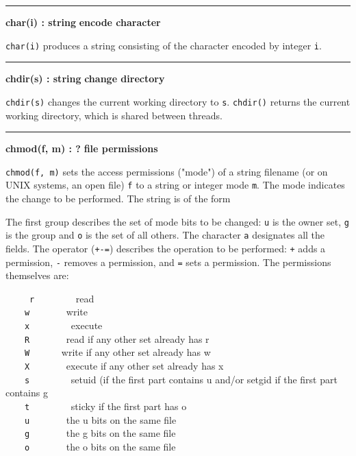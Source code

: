 \bigskip
\hrule\vspace{0.1cm}
\noindent
{\bf char(i) : string } \hfill {\bf encode character}

\noindent
{}\texttt{char(i)} produces a string consisting of the
character encoded by integer \texttt{i}.

\bigskip
\hrule\vspace{0.1cm}
\noindent
{\bf chdir(s) : string } \hfill {\bf change directory}\WarningNotThreadSafe

\noindent
{}\texttt{chdir(s)} changes the current
working directory to \texttt{s}. \texttt{chdir()} returns the current
working directory, which is shared between threads.


\bigskip
\hrule\vspace{0.1cm}
\noindent
{\bf chmod(f, m) : ? } \hfill {\bf file permissions}

\noindent
{}
\texttt{chmod(f, m)}
sets the access permissions ("mode") of
a string filename (or on UNIX systems, an open file) \texttt{f} to a
string or integer mode \texttt{m}. The mode indicates the change to be
performed. The string is of the form

\iconcode{
\>   [ugoa]*[+-=][rwxRWXstugo]* }%

The first group describes the set of mode bits to be changed: \texttt{u}
is the owner set, \texttt{g} is the group and \texttt{o} is the set of
all others. The character \texttt{a} designates all the fields. The
operator (\texttt{+-=}) describes the operation to be performed:
\texttt{+} adds a permission, \texttt{{}-} removes a permission, and
\texttt{=} sets a permission. The permissions themselves are: 

\ \ \ \ \ \texttt{r} \ \ \ \ \ \ \ \ read\\
 \ \ \ \ \texttt{w} \ \ \ \ \ \ \ write\\
 \ \ \ \ \texttt{x} \ \ \ \ \ \ \ \ execute\\
 \ \ \ \ \texttt{R} \ \ \ \ \ \ \ read if any other set already has
r\\
 \ \ \ \ \texttt{W} \ \ \ \ \ \ write if any other set already has
w\\
 \ \ \ \ \texttt{X} \ \ \ \ \ \ \ execute if any other set already has
x\\
 \ \ \ \ \texttt{s} \ \ \ \ \ \ \ \ setuid (if the first part contains u
and/or setgid if the first part contains g\\
 \ \ \ \ \texttt{t} \ \ \ \ \ \ \ \ sticky if the first part has
o\\
 \ \ \ \ \texttt{u} \ \ \ \ \ \ \ the u bits on the same file\\
 \ \ \ \ \texttt{g} \ \ \ \ \ \ \ the g bits on the same file\\
 \ \ \ \ \texttt{o} \ \ \ \ \ \ \ the o bits on the same file

